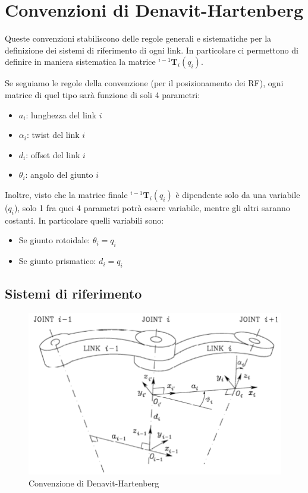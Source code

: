 \section{Convenzioni di Denavit-Hartenberg}
Queste convenzioni stabiliscono delle regole generali e sistematiche per la definizione dei sistemi di riferimento di ogni link. In particolare ci permettono di definire in maniera sistematica la matrice ${}^{i-1}\textbf{T}_i(q_i)$.

Se seguiamo le regole della convenzione (per il posizionamento dei RF), ogni matrice di quel tipo sarà funzione di soli 4 parametri:
\begin{itemize}
	\item $a_i$: lunghezza del link $i$
	\item $\alpha_i$: twist del link $i$
	\item $d_i$: offset del link $i$
	\item $\theta_i$: angolo del giunto $i$
\end{itemize}
Inoltre, visto che la matrice finale ${}^{i-1}\textbf{T}_i(q_i)$ è dipendente solo da una variabile ($q_i$), solo 1 fra quei 4 parametri potrà essere variabile, mentre gli altri saranno costanti. In particolare quelli variabili sono:
\begin{itemize}
	\item Se giunto rotoidale: $\theta_i = q_i$
	\item Se giunto prismatico: $d_i = q_i$
\end{itemize}


\subsection{Sistemi di riferimento}

\begin{figure}[b]
	\centering
	\includegraphics[width=0.6\linewidth]{images/kinematics_5}
	\caption{Convenzione di Denavit-Hartenberg}
	\label{fig:kinematics5}
\end{figure}

